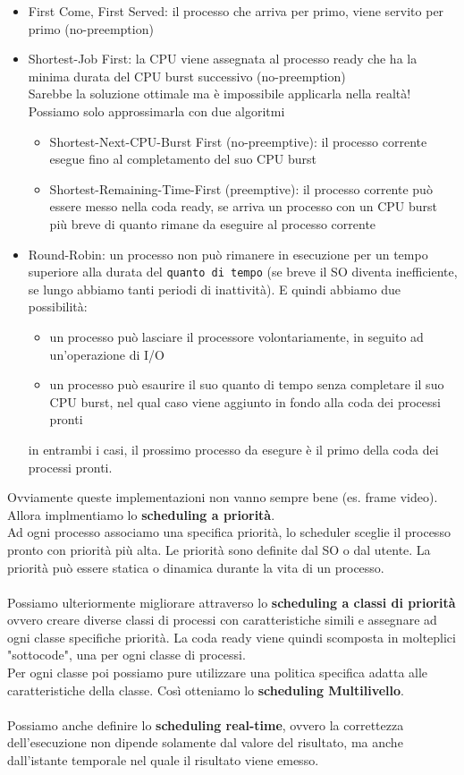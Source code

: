\documentclass[a4paper,12pt]{article}
\begin{document}
\begin{itemize}
  \item First Come, First Served: il processo che arriva per primo, viene servito per primo (no-preemption)
  \item Shortest-Job First: la CPU viene assegnata al processo ready che ha la minima durata del CPU burst successivo (no-preemption)\\
  Sarebbe la soluzione ottimale ma è impossibile applicarla nella realtà! Possiamo solo approssimarla con due algoritmi
  \begin{itemize}
    \item Shortest-Next-CPU-Burst First (no-preemptive): il processo corrente esegue fino al completamento del suo CPU burst
    \item Shortest-Remaining-Time-First (preemptive): il processo corrente può essere messo nella coda ready, se arriva un processo con un CPU burst più breve di quanto rimane da eseguire al processo corrente
  \end{itemize}  
  \item Round-Robin: un processo non può rimanere in esecuzione per un tempo superiore alla durata del \texttt{quanto di tempo} (se breve il SO diventa inefficiente, se lungo abbiamo tanti periodi di inattività). E quindi abbiamo due possibilità:
  \begin{itemize}
    \item un processo può lasciare il processore volontariamente, in seguito ad un'operazione di I/O
    \item un processo può esaurire il suo quanto di tempo senza completare il suo CPU burst, nel qual caso viene aggiunto in fondo alla coda dei processi pronti
  \end{itemize}
  in entrambi i casi, il prossimo processo da esegure è il primo della coda dei processi pronti.
\end{itemize}
Ovviamente queste implementazioni non vanno sempre bene (es. frame video). Allora implmentiamo lo \textbf{scheduling a priorità}. \\
Ad ogni processo associamo una specifica priorità, lo scheduler sceglie il processo pronto con priorità più alta. Le priorità sono definite dal SO o dal utente. La priorità può essere statica o dinamica durante la vita di un processo. \\
\vspace{1em}\\
Possiamo ulteriormente migliorare attraverso lo \textbf{scheduling a classi di priorità} ovvero creare diverse classi di processi con caratteristiche simili e assegnare ad ogni classe specifiche priorità. La coda ready viene quindi scomposta in molteplici "sottocode", una per ogni classe di processi.\\
Per ogni classe poi possiamo pure utilizzare una politica specifica adatta alle caratteristiche della classe. Così otteniamo lo \textbf{scheduling Multilivello}.\\
\vspace{1em}\\
Possiamo anche definire lo \textbf{scheduling real-time}, ovvero la correttezza dell'esecuzione non dipende solamente dal valore del risultato, ma anche dall'istante temporale nel quale il risultato viene emesso.
\end{document}
